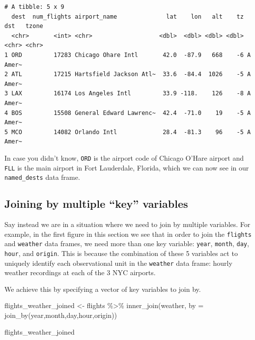 \documentclass[
  letterpaper,
  DIV=11,
  numbers=noendperiod]{scrartcl}
\newenvironment{Shaded}{\begin{snugshade}}{\end{snugshade}}
\newcommand{\AttributeTok}[1]{\textcolor[rgb]{0.40,0.45,0.13}{#1}}
\newcommand{\FunctionTok}[1]{\textcolor[rgb]{0.28,0.35,0.67}{#1}}
\newcommand{\NormalTok}[1]{\textcolor[rgb]{0.00,0.23,0.31}{#1}}
\newcommand{\OtherTok}[1]{\textcolor[rgb]{0.00,0.23,0.31}{#1}}
\newcommand{\SpecialCharTok}[1]{\textcolor[rgb]{0.37,0.37,0.37}{#1}}
\begin{document}
\begin{verbatim}
# A tibble: 5 x 9
  dest  num_flights airport_name              lat    lon   alt    tz dst   tzone
  <chr>       <int> <chr>                   <dbl>  <dbl> <dbl> <dbl> <chr> <chr>
1 ORD         17283 Chicago Ohare Intl       42.0  -87.9   668    -6 A     Amer~
2 ATL         17215 Hartsfield Jackson Atl~  33.6  -84.4  1026    -5 A     Amer~
3 LAX         16174 Los Angeles Intl         33.9 -118.    126    -8 A     Amer~
4 BOS         15508 General Edward Lawrenc~  42.4  -71.0    19    -5 A     Amer~
5 MCO         14082 Orlando Intl             28.4  -81.3    96    -5 A     Amer~
\end{verbatim}

In case you didn't know, \texttt{ORD} is the airport code of Chicago
O'Hare airport and \texttt{FLL} is the main airport in Fort Lauderdale,
Florida, which we can now see in our \texttt{named\_dests} data frame.

\subsection{Joining by multiple ``key''
variables}\label{joining-by-multiple-key-variables}

Say instead we are in a situation where we need to join by multiple
variables. For example, in the first figure in this section we see that
in order to join the \texttt{flights} and \texttt{weather} data frames,
we need more than one key variable: \texttt{year}, \texttt{month},
\texttt{day}, \texttt{hour}, and \texttt{origin}. This is because the
combination of these 5 variables act to uniquely identify each
observational unit in the \texttt{weather} data frame: hourly weather
recordings at each of the 3 NYC airports.

We achieve this by specifying a vector of key variables to join by.

\begin{Shaded}
\begin{Highlighting}[]
\NormalTok{flights\_weather\_joined }\OtherTok{\textless{}{-}}\NormalTok{ flights  }\SpecialCharTok{\%\textgreater{}\%}
  \FunctionTok{inner\_join}\NormalTok{(weather,}
             \AttributeTok{by =} \FunctionTok{join\_by}\NormalTok{(year,month,day,hour,origin))}

\NormalTok{flights\_weather\_joined}
\end{Highlighting}
\end{Shaded}
\end{document}
